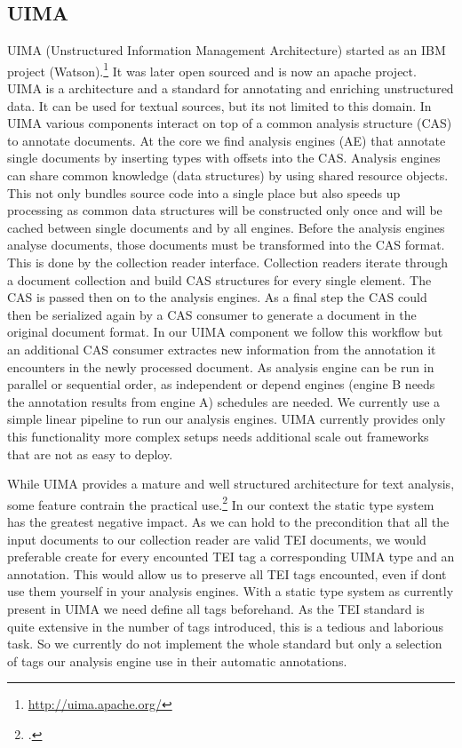 \documentclass[12pt, draft]{article}
\begin{document}
\subsection{UIMA}

UIMA (Unstructured Information Management Architecture) started as an
 IBM project (Watson).\footnote{\url{http://uima.apache.org/}}
It was later open sourced and is now an apache project.
UIMA is a architecture and a standard for annotating and enriching unstructured data.
It can be used for textual sources, but its not limited to this domain.
In UIMA various components interact on top of a common analysis structure (CAS)
to annotate documents. At the core we find analysis engines (AE) that
annotate single documents by inserting types with offsets into the CAS.
Analysis engines can share common knowledge (data structures) by
using shared resource objects. This not only bundles
source code into a single place but also speeds up processing as
common data structures will be constructed only once and will be cached
between single documents and by all engines.
Before the analysis engines analyse documents, those documents
must be transformed into the CAS format.
This is done by the collection reader interface. Collection readers
iterate through a document collection and build CAS structures
for every single element. The CAS is passed then on to the analysis engines.
As a final step the CAS could then be serialized again
by a CAS consumer to generate a document in the original document format.
In our UIMA component we follow this workflow but an additional CAS consumer
extractes new information from the annotation it encounters
in the newly processed document.  As analysis engine can be run in
parallel or sequential order, as independent or
depend engines (engine B needs the annotation results from engine A)
schedules are needed. We currently use a simple linear pipeline to
run our analysis engines. UIMA currently provides only this functionality
more complex setups needs additional scale out frameworks that are
not as easy to deploy.

While UIMA provides a mature and well structured architecture for text analysis,
some feature contrain the practical use.\footcite{Goetz:2014}
In our context the static type system has the greatest negative impact.
As we can hold to the precondition that all the input documents to our
collection reader are valid TEI documents, we would preferable
create for every encounted TEI tag a corresponding UIMA type and an annotation. 
This would allow us to preserve all TEI tags encounted, even if dont use them
yourself in your analysis engines. With a static type system
as currently present in UIMA we need define all tags beforehand.
As the TEI standard is quite extensive in the number of tags introduced,
this is a tedious and laborious task.
So we currently do not implement the whole standard but only a selection of tags
our analysis engine use in their automatic annotations.
\end{document}
